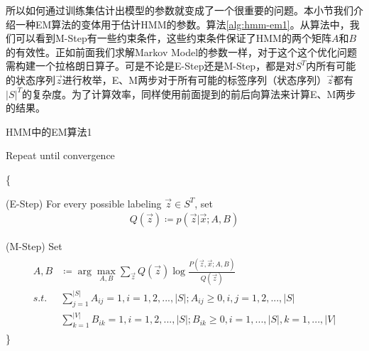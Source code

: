 所以如何通过训练集估计出模型的参数就变成了一个很重要的问题。本小节我们介绍一种EM算法的变体用于估计HMM的参数。算法\ref{alg:hmm-em1}。从算法中，我们可以看到M-Step有一些约束条件，这些约束条件保证了HMM的两个矩阵$A$和$B$的有效性。正如前面我们求解Markov Model的参数一样，对于这个这个优化问题需构建一个拉格朗日算子。可是不论是E-Step还是M-Step，都是对$S^{T}$内所有可能的状态序列$\vec{z}$进行枚举，E、M两步对于所有可能的标签序列（状态序列）$\vec{z}$都有$|S|^{T}$的复杂度。为了计算效率，同样使用前面提到的前后向算法来计算E、M两步的结果。
\begin{algorithm}
\caption{HMM中的EM算法1} 
\label{alg:hmm-em1}
\begin{algorithmic}[1]
  Repeat until convergence

  \{             

     (E-Step) For every possible labeling $\vec{z}\in{S^{T}}$, set 
     \begin{align}\nonumber
      Q(\vec{z}) \coloneqq p(\vec{z}|\vec{x};A,B)
     \end{align}

     (M-Step) Set 
     \begin{align}\nonumber
     \begin{split}
      A, B &\coloneqq \arg\mathop{\max}_{A,B}\sum_{\vec{z}}Q(\vec{z})\log\frac{P(\vec{z},\vec{x};A,B)}{Q(\vec{z})} \\
      s.t. &\sum_{j=1}^{|S|} A_{ij} = 1, i=1,2,...,|S|; A_{ij}\geq 0,i,j=1,2,...,|S|  \\
           &\sum_{k=1}^{|V|} B_{ik} = 1, i=1,2,...,|S|; B_{ik}\geq 0,i=1,...,|S|,k=1,...,|V|
      \end{split}
     \end{align}     
  \}
\end{algorithmic}
\end{algorithm}

